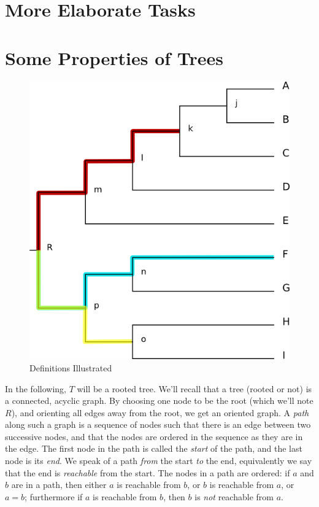 \documentclass[a4paper,10pt]{report}
\theoremstyle{definition}
\begin{document}
\chapter{More Elaborate Tasks}
\label{chap_adv}

\appendix

\chapter{Some Properties of Trees}
\label{sct_defining_clades}
\begin{figure}[t]
 \centering
 \includegraphics{prop_tree.png}
  \caption{Definitions Illustrated}
 \label{fig_app_tree_prop}
\end{figure}

In the following, $T$ will be a rooted tree. We'll recall that a tree (rooted or not) is a connected, acyclic graph. By choosing one node to be the root (which we'll note $R$), and orienting all edges away from the root, we get an oriented graph. A \textit{path} along such a graph is a sequence of nodes such that there is an edge between two successive nodes, and that the nodes are ordered in the sequence as they are in the edge. The first node in the path is called the \textit{start} of the path, and the last node is its \textit{end}. We speak of a path \textit{from} the start \textit{to} the end, equivalently we say that the end is \textit{reachable} from the start. The nodes in a path are ordered: if $a$ and $b$ are in a path, then either $a$ is reachable from $b$, or $b$ is reachable from $a$, or $a = b$; furthermore if $a$ is reachable from $b$, then $b$ is \textit{not} reachable from $a$.
\end{document}
